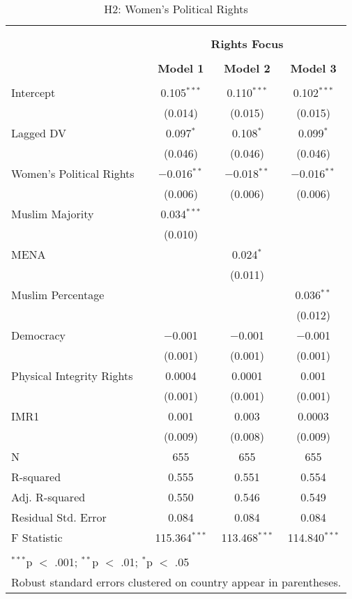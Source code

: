 
\begin{table}[!htbp] \centering 
  \caption{H2: Women's Political Rights} 
  \label{} 
\begin{tabular}{@{\extracolsep{5pt}}lccc} 
\\[-1.8ex]\hline \\[-1.8ex] 
\\[-1.8ex] & \multicolumn{3}{c}{\textbf{Rights Focus}} \\ 
\\[-1.8ex] & \textbf{Model 1} & \textbf{Model 2} & \textbf{Model 3}\\ 
\hline \\[-1.8ex] 
 Intercept & 0.105$^{***}$ & 0.110$^{***}$ & 0.102$^{***}$ \\ 
  & (0.014) & (0.015) & (0.015) \\ 
  Lagged DV & 0.097$^{*}$ & 0.108$^{*}$ & 0.099$^{*}$ \\ 
  & (0.046) & (0.046) & (0.046) \\ 
  Women's Political Rights & $-$0.016$^{**}$ & $-$0.018$^{**}$ & $-$0.016$^{**}$ \\ 
  & (0.006) & (0.006) & (0.006) \\ 
  Muslim Majority & 0.034$^{***}$ &  &  \\ 
  & (0.010) &  &  \\ 
  MENA &  & 0.024$^{*}$ &  \\ 
  &  & (0.011) &  \\ 
  Muslim Percentage &  &  & 0.036$^{**}$ \\ 
  &  &  & (0.012) \\ 
  Democracy & $-$0.001 & $-$0.001 & $-$0.001 \\ 
  & (0.001) & (0.001) & (0.001) \\ 
  Physical Integrity Rights & 0.0004 & 0.0001 & 0.001 \\ 
  & (0.001) & (0.001) & (0.001) \\ 
  IMR1 & 0.001 & 0.003 & 0.0003 \\ 
  & (0.009) & (0.008) & (0.009) \\ 
 N & 655 & 655 & 655 \\ 
R-squared & 0.555 & 0.551 & 0.554 \\ 
Adj. R-squared & 0.550 & 0.546 & 0.549 \\ 
Residual Std. Error & 0.084 & 0.084 & 0.084 \\ 
F Statistic & 115.364$^{***}$ & 113.468$^{***}$ & 114.840$^{***}$ \\ 
\hline \\[-1.8ex] 
\multicolumn{4}{l}{$^{***}$p $<$ .001; $^{**}$p $<$ .01; $^{*}$p $<$ .05} \\ 
\multicolumn{4}{l}{Robust standard errors clustered on country appear in parentheses.} \\ 
\end{tabular} 
\end{table} 
